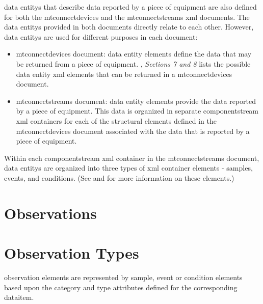 \glspl{data entity} that describe data reported by a piece of equipment are also defined for both the \gls{mtconnectdevices} and the \gls{mtconnectstreams} \gls{xml} documents.  The \glspl{data entity} provided in both documents directly relate to each other.  However, \glspl{data entity} are used for different purposes in each document:

\begin{itemize}
\item \gls{mtconnectdevices} document: \gls{data entity} elements define the data that may be returned from a piece of equipment.  , \textit{Sections 7 and 8} lists the possible \gls{data entity} \gls{xml} elements that can be returned in a \gls{mtconnectdevices} document.  

\item \gls{mtconnectstreams} document: \gls{data entity} elements provide the data reported by a piece of equipment.  This data is organized in separate \gls{componentstream} \gls{xml} containers for each of the \glspl{structural element} defined in the \gls{mtconnectdevices} document associated with the data that is reported by a piece of equipment.  
\end{itemize}

Within each \gls{componentstream} \gls{xml} container in the \gls{mtconnectstreams} document, \glspl{data entity} are organized into three types of \gls{xml} container elements - \glspl{sample}, \glspl{event}, and \glspl{condition}.  (See  and  for more information on these elements.)


\section{Observations}
\label{sec:Observations}




\section{Observation Types}
\label{sec:Observation Types}
\gls{observation} elements are represented by \gls{sample}, \gls{event} or \gls{condition} elements based upon the \gls{category} and \gls{type} attributes defined for the corresponding \gls{dataitem}.




